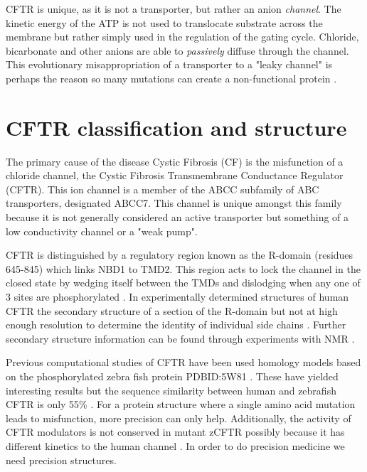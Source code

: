 CFTR is unique, as it is not a transporter, but rather an anion \textit{channel}. The kinetic energy of the ATP is not used to translocate substrate across the membrane but rather simply used in the regulation of the gating cycle. Chloride, bicarbonate and other anions are able to \textit{passively} diffuse through the channel. This evolutionary misappropriation of a transporter to a "leaky channel" is perhaps the reason so many mutations can create a non-functional protein \cite{linsdell2018}.

\section{CFTR classification and structure}

The primary cause of the disease Cystic Fibrosis (CF) is the misfunction of a chloride channel, the Cystic Fibrosis Transmembrane Conductance Regulator (CFTR). This ion channel is a member of the ABCC subfamily of ABC transporters, designated ABCC7. This channel is unique amongst this family because it is not generally considered an active transporter but something of a low conductivity channel or a "weak pump"\cite{linsdell2018}.

CFTR is distinguished by a regulatory region known as the R-domain (residues 645-845) which links NBD1 to TMD2. This region acts to lock the channel in the closed state by wedging itself between the TMDs and dislodging when any one of 3 sites are phosphorylated \cite{mihalyi2020}. In experimentally determined structures of human CFTR the secondary structure of a section of the R-domain but not at high enough resolution to determine the identity of individual side chains \cite{zhang2018}\cite{zhang2016}. Further secondary structure information can be found through experiments with NMR \cite{Baker2007}.

Previous computational studies of CFTR have been used homology models based on the phosphorylated zebra fish protein PDBID:5W81 \cite{zhang2017a}. These have yielded interesting results but the sequence similarity between human and zebrafish CFTR is only 55\% \cite{}. For a protein structure where a single amino acid mutation leads to misfunction, more precision can only help. Additionally, the activity of CFTR modulators is not conserved in mutant zCFTR possibly because it has different kinetics to the human channel \cite{}. In order to do precision medicine we need precision structures. 

